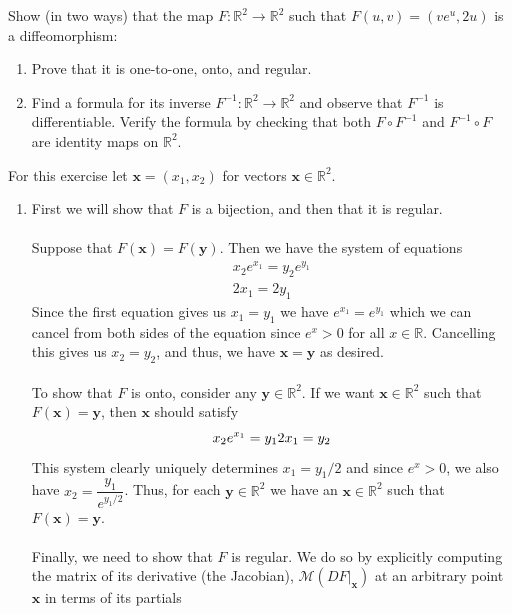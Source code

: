 \documentclass[12 pt, letterpaper]{hmcpset}
\begin{document}
\pagebreak

\begin{problem}[Problem 2.]
	Show (in two ways) that the map $F : \mathbb{R}^2 \to \mathbb{R}^2$ such that $F(u, v) = (v e^u, 2u)$ is a diffeomorphism:
	\begin{enumerate}
		\item Prove that it is one-to-one, onto, and regular.
		\item Find a formula for its inverse  $F^{-1} : \mathbb{R}^2 \to \mathbb{R}^2$ and observe that $F^{-1}$ is differentiable. Verify the formula by checking that both $F \circ F^{-1}$ and $F^{-1} \circ F$ are identity maps on $\mathbb{R}^2$.
	\end{enumerate}
\end{problem}

\begin{solution}
	For this exercise let $\mathbf{x} = (x_1, x_2)$ for vectors $\mathbf{x} \in \mathbb{R}^2$.	
	\begin{enumerate}
		\item	
			First we will show that $F$ is a bijection, and then that it is regular. \\\\
			Suppose that $F(\mathbf{x}) = F(\mathbf{y})$. Then we have the system of equations
			\[
				\begin{gathered}
					x_2 e^{x_1} = y_2 e^{y_1} \\
					2 x_1 = 2 y_1
				\end{gathered}
			\]
			Since the first equation gives us $x_1 = y_1$ we have $e^{x_1} = e^{y_1}$ which we can cancel from both sides of the equation since $e^x > 0$ for all $x \in \mathbb{R}$. Cancelling this gives us $x_2 = y_2$, and thus, we have $\mathbf{x} = \mathbf{y}$ as desired. \\\\
			To show that $F$ is onto, consider any $\mathbf{y} \in \mathbb{R}^2$. If we want $\mathbf{x} \in \mathbb{R}^2$ such that $F(\mathbf{x}) = \mathbf{y}$, then $\mathbf{x}$ should satisfy
			\[
				x_2 e^{x_1} = y_1 \\
				2 x_1 = y_2 \\
			\]
			This system clearly uniquely determines $x_1 = y_1/2$ and since $e^x > 0$, we also have $x_2 = \dfrac{y_1}{e^{y_1/2}}$. Thus, for each $\mathbf{y} \in \mathbb{R}^2$ we have an $\mathbf{x} \in \mathbb{R}^2$ such that $F(\mathbf{x}) = \mathbf{y}$. \\\\
			Finally, we need to show that $F$ is regular. We do so by explicitly computing the matrix of its derivative (the Jacobian), $\mathcal{M}(DF \Big |_{\mathbf{x}})$ at an arbitrary point $\mathbf{x}$ in terms of its partials

\end{enumerate}
\end{solution}
\end{document}
